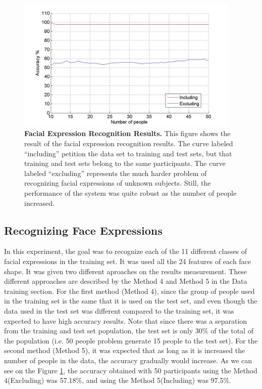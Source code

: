 \documentclass[]{article}
\begin{document}
\begin{figure}[ht]
\begin{center}
\vspace{-3mm}
\includegraphics[width=0.95\textwidth]{figures/figureRecognizeFacialExpressionTrue.jpg}
\end{center}
\caption{\textbf{Facial Expression Recognition Results.} This figure shows the result of the facial expression recognition results.
The curve labeled ``including'' petition the data set to training and test sets, but that training and test sets belong to the same participants.
The curve labeled ``excluding'' represents the much harder problem of recognizing facial expressions of unknown subjects. Still, 
the performance of the system was quite robust as the number of people increased.}
\label{identityRecognition}
\end{figure}

\subsection{Recognizing Face Expressions}

In this experiment, the goal was to recognize each of the 11 different classes
of facial expressions in the training set. It was used all the 24 features of
each face shape. It was given two different aproaches on the results
measurement. These different approaches are described by the Method 4 and
Method 5 in the Data training section.
For the first method (Method 4), since the group of people used in the training
set is the same that it is used on the test set, and even though the data used in the test
set was different compared to the training set, it was expected to have high
accuracy results. Note that since there was a separation from the training and
test set population, the test set is only 30\% of the total of the population
(i.e. 50 people problem generate 15 people to the test set).
For the second method (Method 5), it was expected that as long as it is
increased the number of people in the data, the accuracy gradually would increase.
As we can see on the Figure \ref{identityRecognition}, the accuracy obtained
with 50 participants using the Method 4(Excluding) was 57.18\%, and using the
Method 5(Including) was 97.5\%.
 
\end{document}
